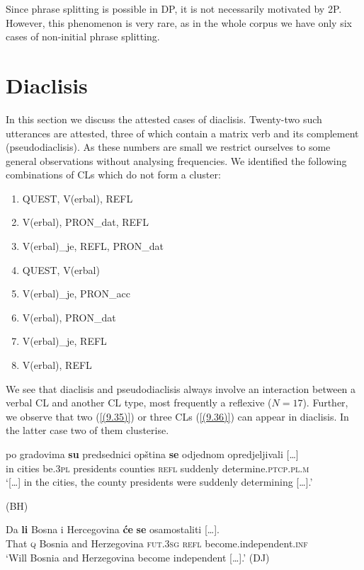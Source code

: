 \noindent Since phrase splitting is possible in DP, it is not necessarily motivated by 2P. However, this phenomenon is very rare, as in the whole corpus we have only six cases of  non-initial phrase splitting. 

\section{Diaclisis}
\label{Diaclisis:9}

In this section we discuss the attested cases of diaclisis. Twenty-two such utterances are attested, three of which contain a matrix verb and its complement (pseudodiaclisis). As these numbers are small we restrict ourselves to some general observations without analysing frequencies. We identified the following combinations of CLs which do not form a cluster:
\begin{enumerate}
	
\item QUEST, V(erbal), REFL
\item V(erbal), PRON\_dat, REFL
\item V(erbal)\_je, REFL, PRON\_dat
\item QUEST, V(erbal)
\item V(erbal)\_je, PRON\_acc
\item V(erbal), PRON\_dat
\item V(erbal)\_je, REFL 
\item V(erbal), REFL

\end{enumerate}

We see that diaclisis and pseudodiaclisis always involve an interaction between a verbal CL and another CL type, most frequently a reflexive ($N=17$). Further, we observe that two (\ref{(9.35)}) or three CLs (\ref{(9.36)}) can appear in diaclisis. In the latter case two of them clusterise.

\begin{exe}\ex\label{(9.35)}
\gll  [\dots] po  gradovima  \textbf{su}  predsednici opština  \textbf{se}  odjednom {opredjeljivali   [\dots]} \\
{} in cities be.3\textsc{pl}  presidents counties \textsc{refl}  suddenly determine.\textsc{ptcp}.\textsc{pl}.\textsc{m} \\
\glt ‘[\dots] in the cities, the county presidents were suddenly determining  [\dots].’ \\
\strut\hfill (BH)

\ex\label{(9.36)}
\gll Da  \textbf{li}  Bosna  i  Hercegovina  \textbf{će}  \textbf{se}  {osamostaliti  [\dots].} \\
That  \textsc{q}  Bosnia and Herzegovina \textsc{fut}.3\textsc{sg}  \textsc{refl}  become.independent.\textsc{inf} \\
\glt ‘Will Bosnia and Herzegovina become independent  [\dots].’
\hfill (DJ)
\end{exe}

